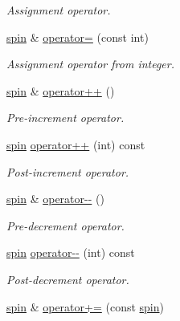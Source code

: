 \begin{DoxyCompactItemize}
\begin{DoxyCompactList}\small\item\em Assignment operator. \end{DoxyCompactList}\item 
\hypertarget{a00514_ab0bf38674fff23e6842f4e761de03111}{}\hyperlink{a00514}{spin} \& \hyperlink{a00514_ab0bf38674fff23e6842f4e761de03111}{operator=} (const int)\label{a00514_ab0bf38674fff23e6842f4e761de03111}

\begin{DoxyCompactList}\small\item\em Assignment operator from integer. \end{DoxyCompactList}\item 
\hypertarget{a00514_a45000110fac522fee51e3d67e8796c0e}{}\hyperlink{a00514}{spin} \& \hyperlink{a00514_a45000110fac522fee51e3d67e8796c0e}{operator++} ()\label{a00514_a45000110fac522fee51e3d67e8796c0e}

\begin{DoxyCompactList}\small\item\em Pre-\/increment operator. \end{DoxyCompactList}\item 
\hypertarget{a00514_a2ae3bc5eb4f2e0de2e6746cada283440}{}\hyperlink{a00514}{spin} \hyperlink{a00514_a2ae3bc5eb4f2e0de2e6746cada283440}{operator++} (int) const \label{a00514_a2ae3bc5eb4f2e0de2e6746cada283440}

\begin{DoxyCompactList}\small\item\em Post-\/increment operator. \end{DoxyCompactList}\item 
\hypertarget{a00514_a477c48621c45a7916c3df0255dff7d1b}{}\hyperlink{a00514}{spin} \& \hyperlink{a00514_a477c48621c45a7916c3df0255dff7d1b}{operator-\/-\/} ()\label{a00514_a477c48621c45a7916c3df0255dff7d1b}

\begin{DoxyCompactList}\small\item\em Pre-\/decrement operator. \end{DoxyCompactList}\item 
\hypertarget{a00514_a300d54fc68e6f4f435d9edaa5efb2e6e}{}\hyperlink{a00514}{spin} \hyperlink{a00514_a300d54fc68e6f4f435d9edaa5efb2e6e}{operator-\/-\/} (int) const \label{a00514_a300d54fc68e6f4f435d9edaa5efb2e6e}

\begin{DoxyCompactList}\small\item\em Post-\/decrement operator. \end{DoxyCompactList}\item 
\hypertarget{a00514_a432bbded01ee85e254f3bfb71498f617}{}\hyperlink{a00514}{spin} \& \hyperlink{a00514_a432bbded01ee85e254f3bfb71498f617}{operator+=} (const \hyperlink{a00514}{spin})\label{a00514_a432bbded01ee85e254f3bfb71498f617}


\end{DoxyCompactItemize}
